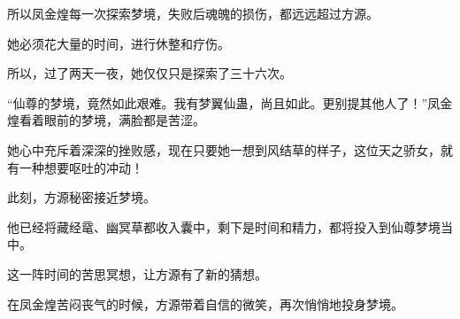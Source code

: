 \begin{this_body}
所以凤金煌每一次探索梦境，失败后魂魄的损伤，都远远超过方源。

她必须花大量的时间，进行休整和疗伤。

所以，过了两天一夜，她仅仅只是探索了三十六次。

“仙尊的梦境，竟然如此艰难。我有梦翼仙蛊，尚且如此。更别提其他人了！”凤金煌看着眼前的梦境，满脸都是苦涩。

她心中充斥着深深的挫败感，现在只要她一想到风结草的样子，这位天之骄女，就有一种想要呕吐的冲动！

此刻，方源秘密接近梦境。

他已经将藏经鼋、幽冥草都收入囊中，剩下是时间和精力，都将投入到仙尊梦境当中。

这一阵时间的苦思冥想，让方源有了新的猜想。

在凤金煌苦闷丧气的时候，方源带着自信的微笑，再次悄悄地投身梦境。

\end{this_body}

